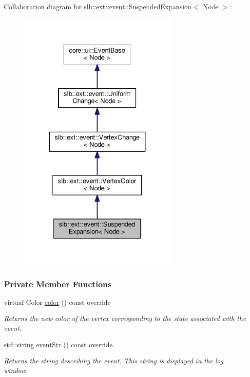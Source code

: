 Collaboration diagram for slb\+:\+:ext\+:\+:event\+:\+:Suspended\+Expansion$<$ Node $>$\+:\nopagebreak
\begin{figure}[H]
\begin{center}
\leavevmode
\includegraphics[width=227pt]{structslb_1_1ext_1_1event_1_1SuspendedExpansion__coll__graph}
\end{center}
\end{figure}
\subsubsection*{Private Member Functions}
\begin{DoxyCompactItemize}
\item 
virtual Color \hyperlink{structslb_1_1ext_1_1event_1_1SuspendedExpansion_a02b68e81e35985526168aab04b775478}{color} () const override
\begin{DoxyCompactList}\small\item\em Returns the new color of the vertex corresponding to the state associated with the event. \end{DoxyCompactList}\item 
std\+::string \hyperlink{structslb_1_1ext_1_1event_1_1SuspendedExpansion_a30bd077f8e58d9c056ca727c132adbfa}{event\+Str} () const override
\begin{DoxyCompactList}\small\item\em Returns the string describing the event. This string is displayed in the log window. \end{DoxyCompactList}\end{DoxyCompactItemize}
